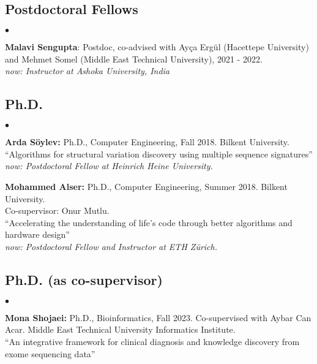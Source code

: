 \documentclass[margin,line]{res}
\newenvironment{list2}{
  \begin{list}{$\bullet$}{%
      \setlength{\itemsep}{0.1cm}
      \setlength{\parsep}{0in} \setlength{\parskip}{0in}
      \setlength{\topsep}{0in} \setlength{\partopsep}{0in} 
      \setlength{\leftmargin}{0.2in}}}{\end{list}}
\begin{document}
\begin{resume}
\subsection{\small \sc Postdoctoral Fellows}
\begin{list2}
\item 
{\bf Malavi Sengupta}: Postdoc, co-advised with Ayça Ergül (Hacettepe University) and Mehmet Somel (Middle East Technical University), 2021 - 2022.\\
\textit{now: Instructor at Ashoka University,  India}
\end{list2}

\vspace*{-.4cm}

\subsection{\small \sc Ph.D.}
\begin{list2}
\item
  {\bf Arda Söylev:} Ph.D., Computer Engineering, Fall 2018.
  Bilkent University. \\
  ``Algorithms for structural variation discovery using multiple sequence signatures''\\
    {\it now: Postdoctoral Fellow at Heinrich Heine University.}
\item
  {\bf Mohammed Alser:} Ph.D., Computer Engineering, Summer 2018.
  Bilkent University.\\ Co-supervisor: Onur Mutlu.\\
  ``Accelerating the understanding of life’s code through better algorithms and hardware design''\\
  {\it now: Postdoctoral Fellow and Instructor at ETH Zürich.}
\end{list2}

\vspace*{-.4cm}
\subsection{\small \sc Ph.D. (as co-supervisor)}
\begin{list2}
\item
{\bf Mona Shojaei:} Ph.D., Bioinformatics,  Fall 2023.
Co-supervised with Aybar Can Acar.
  Middle East Technical University Informatics Institute.\\
  ``An integrative framework for clinical diagnosis and knowledge discovery from exome sequencing data''


\end{list2}
\end{resume}
\end{document}
